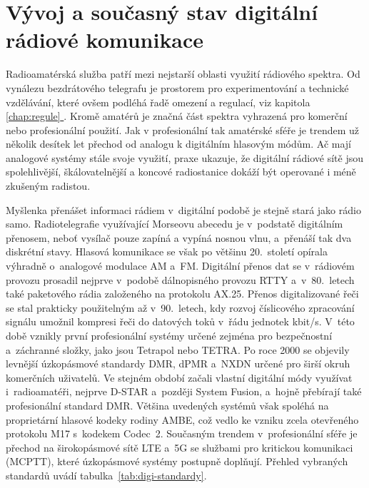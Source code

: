 \documentclass[twoside]{ctuthesis}
\begin{document}
\maketitle

\chapter{Vývoj a současný stav digitální rádiové komunikace}

Radioamatérská služba patří mezi nejstarší oblasti využití rádiového spektra. Od vynálezu bezdrátového telegrafu je prostorem pro experimentování
a technické vzdělávání, které ovšem podléhá řadě omezení a regulací, viz kapitola \hyperref[chap:regule]{\ref*{chap:regule} }.
Kromě amatérů je značná část spektra vyhrazená pro komerční nebo profesionální použití. Jak v profesionální tak amatérské sféře je trendem už několik
desítek let přechod od analogu k digitálním hlasovým módům. Ač mají analogové systémy stále svoje využití, praxe ukazuje, že digitální rádiové sítě
jsou spolehlivější, škálovatelnější a koncové radiostanice dokáží být operované i méně zkušeným radistou.

Myšlenka přenášet informaci rádiem v~digitální podobě je stejně stará jako rádio samo. Radiotelegrafie využívající Morseovu abecedu je v~podstatě
digitálním přenosem, neboť vysílač pouze zapíná a vypíná nosnou vlnu, a~přenáší tak dva diskrétní stavy. Hlasová komunikace se však po většinu
20.~století opírala výhradně o~analogové modulace AM a~FM. Digitální přenos dat se v~rádiovém provozu prosadil nejprve v~podobě dálnopisného provozu
RTTY a~v~80.~letech také paketového rádia založeného na protokolu AX.25. Přenos digitalizované řeči se stal prakticky použitelným až v~90.~letech,
kdy rozvoj číslicového zpracování signálu umožnil kompresi řeči do datových toků v~řádu jednotek kbit/s. V~této době vznikly první profesionální systémy
určené zejména pro bezpečnostní a~záchranné složky, jako jsou Tetrapol nebo TETRA. Po roce 2000 se objevily levnější úzkopásmové standardy DMR, dPMR
a~NXDN určené pro širší okruh komerčních uživatelů. Ve stejném období začali vlastní digitální módy využívat i~radioamatéři, nejprve D-STAR a~později
System Fusion, a~hojně přebírají také profesionální standard DMR. Většina uvedených systémů však spoléhá na proprietární hlasové kodeky rodiny AMBE, což vedlo
ke vzniku zcela otevřeného protokolu M17 s~kodekem Codec~2. Současným trendem v~profesionální sféře je přechod na širokopásmové sítě LTE a~5G se službami pro
kritickou komunikaci (MCPTT), které úzkopásmové systémy postupně doplňují. Přehled vybraných standardů uvádí tabulka~\ref{tab:digi-standardy}.
\end{document}
